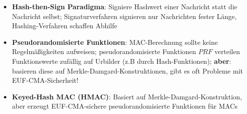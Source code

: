 \begin{itemize}
	\item \textbf{Hash-then-Sign Paradigma}: Signiere Hashwert einer Nachricht statt die Nachricht selbst; Signaturverfahren signieren nur Nachrichten fester Länge, Hashing-Verfahren schaffen Abhilfe
	\item \textbf{Pseudorandomisierte Funktionen}: MAC-Berechnung sollte keine Regelmäßigkeiten aufweisen; pseudorandomisierte Funktionen $PRF$ verteilen Funktionswerte zufällig auf Urbilder (z.B durch Hash-Funktionen); \textbf{aber}: basieren diese auf Merkle-Damgard-Konstruktionen, gibt es oft Probleme mit EUF-CMA-Sicherheit!
	\item \textbf{Keyed-Hash MAC (HMAC)}: Basiert auf Merkle-Damgard-Konstruktion, aber erzeugt EUF-CMA-sichere pseudorandomisierte Funktionen für MACs
\end{itemize}